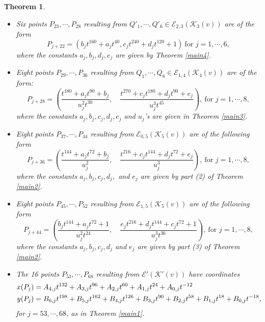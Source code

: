 \documentclass[11pt]{amsart}
\newcommand{\Ee}{{\mathcal E}}
\newcommand{\KK}{{\mathcal K}}
\newtheorem{thm}{Theorem}[section]
\numberwithin{equation}{section}
\numberwithin{table}{section}
\newcommand\<{\langle}
\begin{document}
\begin{thm}
\begin{itemize}
			
				\item[(7)] Six points  $P_{23}, \cdots, P_{28}$  resulting from $Q'_1, \cdots, Q'_6 \in \Ee_{2, 3}(\KK_3(v))$ are of the   form
			$$P_{j+22}= \left( b_j t^{160} + a_j t^{40},
			e_j t^{240} + d_j t^{120} + 1 \right)  \ \text{for } j=1,\cdots, 6,$$
			where the constants $a_j, b_j,  d_j, e_j$ are given 
	 	by Theorem \ref{main4}.
			
				
			\item[(8)] Eight points $P_{29}, \cdots, P_{36}$   resulting from $
			Q_1, \cdots, Q_8 \in \Ee_{1, 4}(\KK_4(v))$  are of the   form:
			$$P_{j+28}=\left(  \frac{t^{180}+ a_j t^{90} + b_j}{u_j^2 t^{30}}, \quad
			\frac{t^{270}+ c_j t^{180} + d_j t^{90} + e_j}{u_j^3 t^{45}}\right), \ \text{for } j=1,\cdots, 8, $$
			where the constants $a_j, b_j, c_j,  d_j, e_j$ and $u_j$'s are given in Theorem \ref{main3}.
		
					\item[(9)]
			Eight points $P_{37}, \cdots, P_{44}$ resulting from $\Ee_{0,5}(\KK_5(v))$ are of the  following form
			$$P_{j+36}=\left(\frac{t^{144}+ a_j t^{72} + b_j}{u_j^2 }, \quad
			\frac{t^{216}+ c_j t^{144} + d_j t^{72} + e_j}{u_j^3}\right), \ \text{for } j=1,\cdots, 8, $$
			where the constants $a_j, b_j, c_j,  d_j, $ and $e_j$ are given by part (2) of Theorem \ref{main2}.
			
				
			\item[(10)]
			Eight points $P_{45}, \cdots, P_{52}$   resulting from $\Ee_{1,5}(\KK_5(v))$  are of the following form 
			$$P_{j+44}=\left(\frac{b_j t^{144}+ a_j t^{72} + 1}{u_j^2 t^{24}}, \quad
			\frac{e_j t^{216}+ d_j t^{144} + c_j t^{72} + 1}{u_j^3 t^{36}}\right), \ \text{for } j=1,\cdots, 8, $$
			where the constants $a_j, b_j, c_j,  d_j$ and $  e_j$ are given by part (3) of Theorem \ref{main2}.
			
			\item[(11)] The 16 points $P_{53}, \cdots, P_{68}$ resulting from $\Ee' (\KK'(v)) $ have coordinates
		\begin{align*}
			x(P_{j}) & =   A_{4,j} t^{132} + A_{3,j} t^{96} + A_{2,j} t^{60} + A_{1,j} t^{24} + A_{0,j} t^{-12} \notag \\ 			 
			y(P_{j}) &=   B_{6,j} t^{198} + B_{5,j} t^{162} + B_{4,j} t^{126} +B_{3,j} t^{90} + B_{2,j} t^{58}
		+	B_{1,j} t^{18} + B_{0,j} t^{-18}, 
		\end{align*}
	for $j=53, \cdots, 68$, as in Theorem \ref{main1}.
	\end{itemize}
\end{thm}
\end{document}
